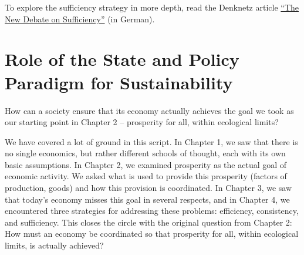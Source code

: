 \documentclass[
  british,
  a4paper,
  DIV=11,
  numbers=noendperiod,
  oneside,
  openany]{scrreprt}
\begin{document}
\begin{tcolorbox}[enhanced jigsaw, arc=.35mm, bottomrule=.15mm, bottomtitle=1mm, breakable, colback=white, colbacktitle=quarto-callout-note-color!10!white, colframe=quarto-callout-note-color-frame, coltitle=black, left=2mm, leftrule=.75mm, opacityback=0, opacitybacktitle=0.6, rightrule=.15mm, title={Further reading}, titlerule=0mm, toprule=.15mm, toptitle=1mm]

To explore the sufficiency strategy in more depth, read the Denknetz
article \href{https://ilias.unibe.ch/go/file/3803485}{``The New Debate
on Sufficiency''} (in German).

\end{tcolorbox}

\chapter{Role of the State and Policy Paradigm for
Sustainability}\label{role-of-the-state-and-policy-paradigm-for-sustainability}

\begin{tcolorbox}[enhanced jigsaw, arc=.35mm, bottomrule=.15mm, bottomtitle=1mm, breakable, colback=white, colbacktitle=quarto-callout-note-color!10!white, colframe=quarto-callout-note-color-frame, coltitle=black, left=2mm, leftrule=.75mm, opacityback=0, opacitybacktitle=0.6, rightrule=.15mm, title={Guiding question}, titlerule=0mm, toprule=.15mm, toptitle=1mm]

How can a society ensure that its economy actually achieves the goal we
took as our starting point in Chapter 2 -- prosperity for all, within
ecological limits?

\end{tcolorbox}

We have covered a lot of ground in this script. In Chapter 1, we saw
that there is no single economics, but rather different schools of
thought, each with its own basic assumptions. In Chapter 2, we examined
prosperity as the actual goal of economic activity. We asked what is
used to provide this prosperity (factors of production, goods) and how
this provision is coordinated. In Chapter 3, we saw that today's economy
misses this goal in several respects, and in Chapter 4, we encountered
three strategies for addressing these problems: efficiency, consistency,
and sufficiency. This closes the circle with the original question from
Chapter 2: How must an economy be coordinated so that prosperity for
all, within ecological limits, is actually achieved?
\end{document}
